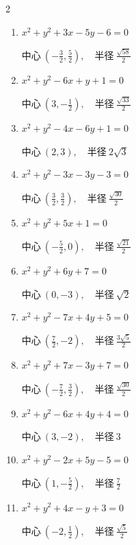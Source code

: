 \begin{multicols}{2}
\begin{enumerate}
  \item $x^{2}+y^{2}+3x-5y-6=0$

        $\displaystyle 中心\: \left(-\frac{3}{2},\frac{5}{2}\right), \quad 半径 \ \frac{\sqrt{58}}{2}$

  \item $x^{2}+y^{2}-6x+y+1=0$

        $\displaystyle 中心\: \left(3,-\frac{1}{2}\right), \quad 半径 \ \frac{\sqrt{33}}{2}$

  \item $x^{2}+y^{2}-4x-6y+1=0$

        $\displaystyle 中心\: \left(2,3\right), \quad 半径 \ 2\sqrt{3}$

  \item $x^{2}+y^{2}-3x-3y-3=0$

        $\displaystyle 中心\: \left(\frac{3}{2},\frac{3}{2}\right), \quad 半径 \ \frac{\sqrt{30}}{2}$

  \item $x^{2}+y^{2}+5x+1=0$

        $\displaystyle 中心\: \left(-\frac{5}{2},0\right), \quad 半径 \ \frac{\sqrt{21}}{2}$

\columnbreak %

  \item $x^{2}+y^{2}+6y+7=0$

        $\displaystyle 中心\: \left(0,-3\right), \quad 半径 \ \sqrt{2}$

  \item $x^{2}+y^{2}-7x+4y+5=0$

        $\displaystyle 中心\: \left(\frac{7}{2},-2\right), \quad 半径 \ \frac{3\sqrt{5}}{2}$

  \item $x^{2}+y^{2}+7x-3y+7=0$

        $\displaystyle 中心\: \left(-\frac{7}{2},\frac{3}{2}\right), \quad 半径 \ \frac{\sqrt{30}}{2}$

  \item $x^{2}+y^{2}-6x+4y+4=0$

        $\displaystyle 中心\: \left(3,-2\right), \quad 半径 \ 3$

  \item $x^{2}+y^{2}-2x+5y-5=0$

        $\displaystyle 中心\: \left(1,-\frac{5}{2}\right), \quad 半径 \ \frac{7}{2}$

  \item $x^{2}+y^{2}+4x-y+3=0$

        $\displaystyle 中心\: \left(-2,\frac{1}{2}\right), \quad 半径 \ \frac{\sqrt{5}}{2}$


\end{enumerate}
\end{multicols}
